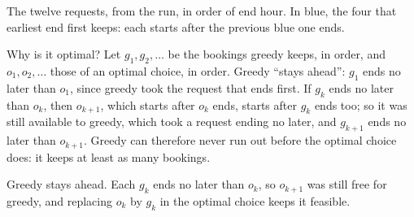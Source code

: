 \label{out:g11:greedy-algorithms:activities}

\begin{omfigure}

{\small The twelve requests, from the run, in order of end hour. In blue, the four that earliest end first keeps:
each starts after the previous blue one ends.}
\end{omfigure}

Why is it optimal? Let $g_1, g_2, \dots$ be the bookings greedy keeps, in order, and $o_1, o_2, \dots$ those of an
optimal choice, in order. Greedy ``stays ahead'': $g_1$ ends no later than $o_1$, since greedy took the request that
ends first. If $g_k$ ends no later than $o_k$, then $o_{k+1}$, which starts after $o_k$ ends, starts after $g_k$ ends
too; so it was still available to greedy, which took a request ending no later, and $g_{k+1}$ ends no later than
$o_{k+1}$. Greedy can therefore never run out before the optimal choice does: it keeps at least as many bookings.

\begin{omfigure}

{\small Greedy stays ahead. Each $g_k$ ends no later than $o_k$, so $o_{k+1}$ was still free for greedy, and
replacing $o_k$ by $g_k$ in the optimal choice keeps it feasible.}
\end{omfigure}


